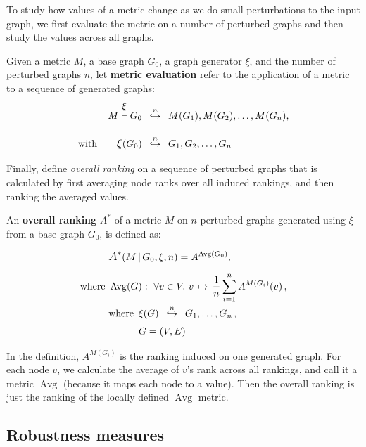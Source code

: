 To study how values of a metric change as we do small perturbations to the input graph, we first evaluate the metric on a number of perturbed graphs and then study the values across all graphs.

Given a metric $M$, a base graph $G_0$, a graph generator $\xi$, and the number of perturbed graphs $n$, let \textbf{metric evaluation} refer to the application of a metric to a sequence of generated graphs:
\begin{align}
    M \overset{\mathlarger{\xi}}{\vdash} G_0 &\generates{n} M(G_1), M(G_2), \dots, M(G_n), \\[10pt]
    \text{with}\qquad \mathlarger{\xi}(G_0) &\generates{n} G_1, G_2, \dots, G_n \nonumber
\end{align}

Finally, define \textsl{overall ranking} on a sequence of perturbed graphs that is calculated by first averaging node ranks over all induced rankings, and then ranking the averaged values.

\begin{definition}
    \label{def:overall_ranking}
    An \textbf{overall ranking} $A^*$ of a metric $M$ on $n$ perturbed graphs generated using $\xi$ from a base graph $G_0$, is defined as:

    \begin{align*}
        &\mathlarger{A^*}\!\left( M \,|\, G_0, \xi, n \right) = A^{\operatorname{Avg}(G_0)} ,\\[5pt]
        \text{where}~&\operatorname{Avg}(G) :\ \forall v \in V.\ v \,\mapsto\, \frac{1}{n} \sum_{i=1}^n A^{M(G_i)}(v)\, , \\
        &\begin{aligned}
             \text{where}~\,&\xi(G) \generates{n} G_1, \dots, G_n\,, \\
             & G = (V, E)
        \end{aligned}
    \end{align*}
\end{definition}

In the definition, $A^{M(G_i)}$ is the ranking induced on one generated graph.
For each node $v$, we calculate the average of $v$'s rank across all rankings, and call it a metric $\operatorname{Avg}$ (because it maps each node to a value).
Then the overall ranking is just the ranking of the locally defined $\operatorname{Avg}$ metric.

\subsection{Robustness measures}

